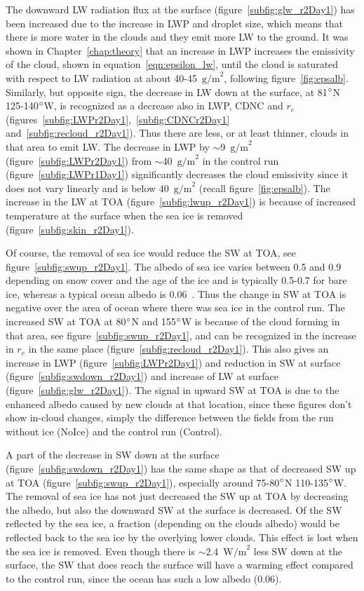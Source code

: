 The downward LW radiation flux at the surface (figure~\ref{subfig:glw_r2Day1}) has been increased due to the increase in LWP and droplet size, which means that there is more water in the clouds and they emit more LW to the ground. It was shown in Chapter~\ref{chap:theory} that an increase in LWP increases the emissivity of the cloud, shown in equation~\ref{eqn:epsilon_lw}, until the cloud is saturated with respect to LW radiation at about 40-45~$\text{g/m}^2$, following figure~\ref{fig:epsalb}. Similarly, but opposite sign, the decrease in LW down at the surface, at 81$\degree$N 125-140$\degree$W, is recognized as a decrease also in LWP, CDNC and $r_e$ (figures~\ref{subfig:LWPr2Day1},~\ref{subfig:CDNCr2Day1} and~\ref{subfig:recloud_r2Day1}). Thus there are less, or at least thinner, clouds in that area to emit LW. The decrease in LWP by $\sim$9~$\text{g/m}^2$ (figure~\ref{subfig:LWPr2Day1}) from $\sim$40~$\text{g/m}^2$ in the control run (figure~\ref{subfig:LWPr1Day1}) significantly decreases the cloud emissivity since it does not vary linearly and is below 40~$\text{g/m}^2$ (recall figure~\ref{fig:epsalb}). The increase in the LW at TOA (figure~\ref{subfig:lwup_r2Day1}) is because of increased temperature at the surface when the sea ice is removed (figure~\ref{subfig:skin_r2Day1}).

Of course, the removal of sea ice would reduce the SW at TOA, see figure~\ref{subfig:swup_r2Day1}. The albedo of sea ice varies between 0.5 and 0.9 depending on snow cover and the age of the ice and is typically 0.5-0.7 for bare ice, whereas a typical ocean albedo is 0.06~\citep{NSIDC}. Thus the change in SW at TOA is negative over the area of ocean where there was sea ice in the control run. The increased SW at TOA at 80$\degree$N and 155$\degree$W is because of the cloud forming in that area, see figure~\ref{subfig:swup_r2Day1}, and can be recognized in the increase in $r_e$ in the same place (figure~\ref{subfig:recloud_r2Day1}). This also gives an increase in LWP (figure~\ref{subfig:LWPr2Day1}) and reduction in SW at surface (figure~\ref{subfig:swdown_r2Day1}) and increase of LW at surface (figure~\ref{subfig:glw_r2Day1}). The signal in upward SW at TOA is due to the enhanced albedo caused by new clouds at that location, since these figures don't show in-cloud changes, simply the difference between the fields from the run without ice (NoIce) and the control run (Control).

A part of the decrease in SW down at the surface (figure~\ref{subfig:swdown_r2Day1}) has the same shape as that of decreased SW up at TOA (figure~\ref{subfig:swup_r2Day1}), especially around 75-80$\degree$N 110-135$\degree$W. The removal of sea ice has not just decreased the SW up at TOA by decreasing the albedo, but also the downward SW at the surface is decreased. Of the SW reflected by the sea ice, a fraction (depending on the clouds albedo) would be reflected back to the sea ice by the overlying lower clouds. This effect is lost when the sea ice is removed. Even though there is $\sim$2.4~$\text{W/m}^2$ less SW down at the surface, the SW that does reach the surface will have a warming effect compared to the control run, since the ocean has such a low albedo (0.06).


